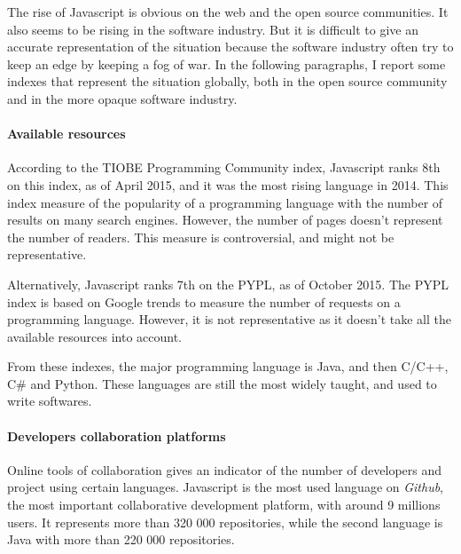The rise of Javascript is obvious on the web and the open source communities.
It also seems to be rising in the software industry.
But it is difficult to give an accurate representation of the situation because the software industry often try to keep an edge by keeping a fog of war.
In the following paragraphs, I report some indexes that represent the situation globally, both in the open source community and in the more opaque software industry.

\paragraph{Available resources}

According to the TIOBE Programming Community index, Javascript ranks 8th on this index, as of April 2015, and it was the most rising language in 2014.
This index measure of the popularity of a programming language with the number of results on many search engines.
However, the number of pages doesn't represent the number of readers.
This measure is controversial, and might not be representative.

Alternatively, Javascript ranks 7th on the PYPL, as of October 2015.
The PYPL index is based on Google trends to measure the number of requests on a programming language.
However, it is not representative as it doesn't take all the available resources into account.

From these indexes, the major programming language is Java, and then C/C++, C\# and Python.
These languages are still the most widely taught, and used to write softwares.

\paragraph{Developers collaboration platforms}

Online tools of collaboration gives an indicator of the number of developers and project using certain languages.
Javascript is the most used language on \textit{Github}, the most important collaborative development platform, with around 9 millions users.
It represents more than 320 000 repositories, while the second language is Java with more than 220 000 repositories.

